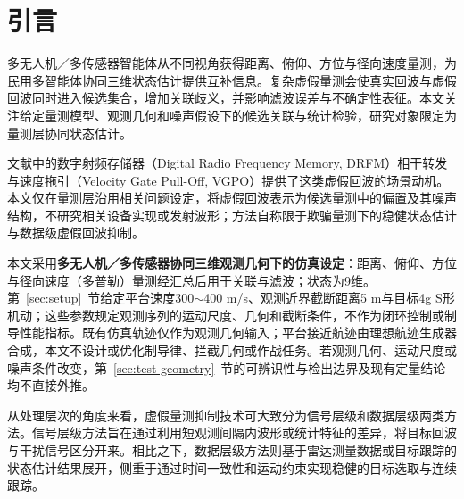 \documentclass[UTF8,a4paper,zihao=-4]{ctexart}
\begin{document}
\section{引言}\label{sec:intro}
多无人机／多传感器智能体从不同视角获得距离、俯仰、方位与径向速度量测，为民用多智能体协同三维状态估计提供互补信息。复杂虚假量测会使真实回波与虚假回波同时进入候选集合，增加关联歧义，并影响滤波误差与不确定性表征。本文关注给定量测模型、观测几何和噪声假设下的候选关联与统计检验，研究对象限定为量测层协同状态估计。

文献中的数字射频存储器（Digital Radio Frequency Memory, DRFM）相干转发与速度拖引（Velocity Gate Pull-Off, VGPO）提供了这类虚假回波的场景动机\cite{ma2026}。本文仅在量测层沿用相关问题设定，将虚假回波表示为候选量测中的偏置及其噪声结构，不研究相关设备实现或发射波形；方法自称限于欺骗量测下的稳健状态估计与数据级虚假回波抑制。

本文采用\textbf{多无人机／多传感器协同三维观测几何下的仿真设定}：距离、俯仰、方位与径向速度（多普勒）量测经汇总后用于关联与滤波；状态为9维。第~\ref{sec:setup}~节给定平台速度300\(\sim\)400 m/s、观测近界截断距离5 m与目标4g S形机动；这些参数规定观测序列的运动尺度、几何和截断条件，不作为闭环控制或制导性能指标。既有仿真轨迹仅作为观测几何输入；平台接近航迹由理想航迹生成器合成，本文不设计或优化制导律、拦截几何或作战任务。若观测几何、运动尺度或噪声条件改变，第~\ref{sec:test-geometry}~节的可辨识性与检出边界及现有定量结论均不直接外推。

从处理层次的角度来看，虚假量测抑制技术可大致分为信号层级和数据层级两类方法\cite{schleher1986}。信号层级方法旨在通过利用短观测间隔内波形或统计特征的差异，将目标回波与干扰信号区分开来。相比之下，数据层级方法则基于雷达测量数据或目标跟踪的状态估计结果展开，侧重于通过时间一致性和运动约束实现稳健的目标选取与连续跟踪。
\end{document}
